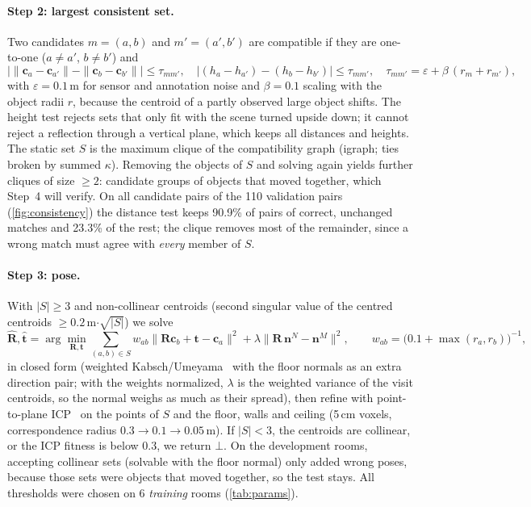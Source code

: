\documentclass[11pt, a4paper]{article}
\newcommand{\ci}{\mathbf{c}}
\begin{document}
\paragraph{Step 2: largest consistent set.} Two candidates $m=(a,b)$ and $m'=(a',b')$ are compatible if they are
one-to-one ($a\ne a'$, $b\ne b'$) and
\begin{equation}
 \bigl|\|\ci_a-\ci_{a'}\|-\|\ci_b-\ci_{b'}\|\bigr|\le\tau_{mm'},\quad
 \bigl|(h_a-h_{a'})-(h_b-h_{b'})\bigr|\le\tau_{mm'},\quad \tau_{mm'}=\varepsilon+\beta\,(r_m+r_{m'}),
\end{equation}
with $\varepsilon=0.1$\,m for sensor and annotation noise and $\beta=0.1$ scaling with the object radii $r$, because the
centroid of a partly observed large object shifts. The height test rejects sets that only fit with the scene turned
upside down; it cannot reject a reflection through a vertical plane, which keeps all distances and heights.
The static set $S$ is the maximum clique of the compatibility graph (igraph; ties broken by summed $\kappa$). Removing the
objects of $S$ and solving again yields further cliques of size $\ge2$: candidate groups of objects that moved together,
which Step~4 will verify. On all candidate pairs of the 110 validation pairs (\cref{fig:consistency}) the distance test
keeps 90.9\% of pairs of correct, unchanged matches and 23.3\% of the rest; the clique removes most of the remainder,
since a wrong match must agree with \emph{every} member of $S$.

\paragraph{Step 3: pose.} With $|S|\ge3$ and non-collinear centroids (second singular value of the centred centroids
$\ge0.2$\,m$\cdot\sqrt{|S|}$) we solve
\begin{equation}
  \hat{\mathbf R},\hat{\mathbf t}=\arg\min_{\mathbf R,\mathbf t}\sum_{(a,b)\in S}w_{ab}\|\mathbf R\ci_b+\mathbf t-\ci_a\|^2
  +\lambda\|\mathbf R\,\mathbf n^N-\mathbf n^M\|^2,\qquad w_{ab}=\bigl(0.1+\max(r_a,r_b)\bigr)^{-1},
\end{equation}
in closed form (weighted Kabsch/Umeyama~\cite{umeyama1991} with the floor normals as an extra direction pair; with the
weights normalized, $\lambda$ is the weighted variance of the visit centroids, so the normal weighs as much as their
spread), then refine with point-to-plane ICP~\cite{chen1992pointplane} on the points of $S$ and the floor, walls and
ceiling (5\,cm voxels, correspondence radius $0.3\to0.1\to0.05$\,m). If $|S|<3$, the centroids are collinear, or the ICP fitness is below 0.3,
we return $\bot$. On the development rooms, accepting collinear sets (solvable with the floor normal) only added wrong
poses, because those sets were objects that moved together, so the test stays. All thresholds were chosen on 6
\emph{training} rooms (\cref{tab:params}).
\end{document}
